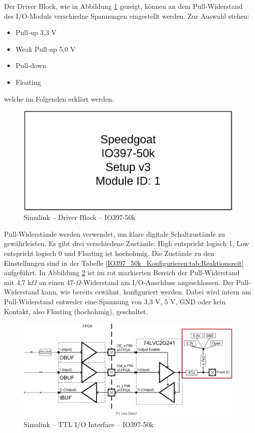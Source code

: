 Der Driver Block, wie in Abbildung \ref{IO397_50k_Konfigurieren:img:Driver_Block} gezeigt, können an dem Pull-Widerstand des I/O-Moduls verschiedne Spannungen eingestellt werden. Zur Auswahl stehen:
\begin{itemize}
	\item Pull-up 3,3 V
	\item Weak Pull-up 5,0 V
	\item Pull-down
	\item Floating
\end{itemize}
welche im Folgenden erklärt werden.

\pagebreak[1]
\begin{figure}[!ht]
	\begin{center}
		\includegraphics[width=.5\textwidth]{img/4_simulink/IO397_50k.png}
		\caption{Simulink – Driver Block – IO397-50k}
		\label{IO397_50k_Konfigurieren:img:Driver_Block}
	\end{center}
\end{figure}
\pagebreak[1]

Pull-Widerstände werden verwendet, um klare digitale Schaltzustände zu gewährleisten. Es gibt drei verschiedene Zustände: High entspricht logisch 1, Low entspricht logisch 0 und Floating ist hochohmig. Die Zustände zu den Einstellungen sind in der Tabelle \ref{IO397_50k_Konfigurieren:tab:Reaktionszeit} aufgeführt.
In Abbildung \ref{IO397_50k_Konfigurieren:img:TTL_IO_Interface} ist im rot markierten Bereich der Pull-Widerstand mit 4,7 k$\Omega$ an einen 47-$\Omega$-Widerstand am I/O-Anschluss angeschlossen. Der Pull-Widerstand kann, wie bereits erwähnt, konfiguriert werden. Dabei wird intern am Pull-Widerstand entweder eine Spannung von 3,3 V, 5 V, GND oder kein Kontakt, also Floating (hochohmig), geschaltet.

\pagebreak[1]
\begin{figure}[!ht]
	\begin{center}
		\includegraphics[width=1.1\textwidth]{img/4_simulink/TTL_IO_Interface.png}
		\caption{Simulink – TTL I/O Interface – IO397-50k \cite[12]{speedgoat:IO397_50k}}
		\label{IO397_50k_Konfigurieren:img:TTL_IO_Interface}
	\end{center}
\end{figure}
\pagebreak[4]



